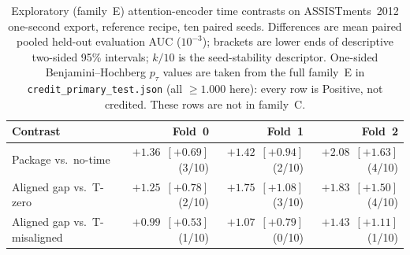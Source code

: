 \begin{table}[tbp]
\caption{Exploratory (family~E) attention-encoder time contrasts on
ASSISTments~2012 one-second export, reference recipe, ten paired seeds.
Differences are mean paired pooled held-out evaluation AUC ($10^{-3}$);
brackets are lower ends of descriptive two-sided 95\% intervals; $k/10$ is
the seed-stability descriptor. One-sided Benjamini--Hochberg $p_\tau$
values are taken from the full family~E in
\texttt{credit\_primary\_test.json} (all $\ge 1.000$ here):
every row is Positive, not credited. These rows are not in family~C.}
\label{tab:attn-assist}
\centering
\footnotesize
\setlength{\tabcolsep}{3pt}
\begin{tabular}{@{}lrrr@{}}
\toprule
Contrast & Fold~0 & Fold~1 & Fold~2 \\
\midrule
Package vs.\ no-time &
$+1.36$~$[+0.69]$ (3/10) &
$+1.42$~$[+0.94]$ (2/10) &
$+2.08$~$[+1.63]$ (4/10) \\
Aligned gap vs.\ T-zero &
$+1.25$~$[+0.78]$ (2/10) &
$+1.75$~$[+1.08]$ (3/10) &
$+1.83$~$[+1.50]$ (4/10) \\
Aligned gap vs.\ T-misaligned &
$+0.99$~$[+0.53]$ (1/10) &
$+1.07$~$[+0.79]$ (0/10) &
$+1.43$~$[+1.11]$ (1/10) \\
\bottomrule
\end{tabular}
\end{table}
